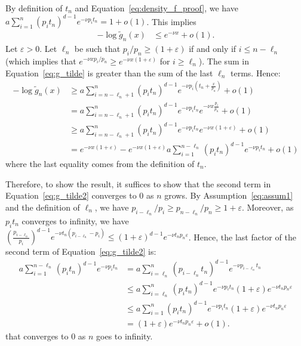 \documentclass{aptpub}
\begin{document}
  By definition of $t_n$ and Equation~\eqref{eq:density_f_proof}, we
  have $a\sum_{i=1}^n (p_it_n)^{d-1} e^{-\nu p_it_n}=1+o(1)$. This
  implies
  \begin{align*}
    -\log \tilde g_n(x) 
      &\le 
        e^{-\nu x}+o(1). 
  \end{align*}
  Let $\varepsilon>0$. Let $\ell_n$ be such that
  $p_{i}/p_n\ge(1+\varepsilon)$ if and only if $i\le n-\ell_n$ (which
  implies that $e^{-\nu x p_i/p_n}\ge e^{-\nu x (1+\varepsilon)}$ for
  $i\ge\ell_n$).  The sum in Equation~\eqref{eq:g_tilde} is greater
  than the sum of the last $\ell_n$ terms. Hence:
  \begin{align}
    - \log \tilde g_n(x) 
    &\ge a\sum_{i=n-\ell_n+1}^{n} (p_it_n)^{d-1} e^{-\nu
      p_i(t_n+\frac{x}{p_n})}+o(1)\nonumber\\ 
    & = a\sum_{i=n-\ell_n+1}^{n} (p_it_n)^{d-1} e^{-\nu
      p_it_n}e^{-\nu x \frac{p_i}{p_n}}  +o(1)\nonumber\\
    &\ge a\sum_{i=n-\ell_n+1}^{n} (p_it_n)^{d-1} e^{-\nu
      p_it_n}e^{-\nu x (1+\varepsilon)}  +o(1)\nonumber\\
    &= e^{-\nu x (1+\varepsilon)} -  e^{-\nu x (1+\varepsilon)}
      a\sum_{i=1}^{n-\ell_n} (p_it_n)^{d-1} e^{-\nu p_it_n} +o(1)
      \label{eq:g_tilde2}
  \end{align}
  where the last equality comes from the definition of $t_n$. 
  
  Therefore, to show the result, it suffices to show that the second
  term in Equation~\eqref{eq:g_tilde2} converges to $0$ as $n$ grows.
  By Assumption~\eqref{eq:assum1} and the definition of $\ell_n$, we
  have $p_{i-\ell_n}/p_i\ge p_{n-\ell_n}/p_n
  \ge1+\varepsilon$.
  Moreover, as $p_it_n$ converges to infinity, we have
  $(\frac{p_{i-\ell_n}}{p_i})^{d-1} e^{-\nu t_n(p_{i-\ell_n}-p_i)}\le
  (1+\varepsilon)^{d-1}e^{-\nu t_np_n\varepsilon}$.
  Hence, the last factor of the second term of
  Equation~\eqref{eq:g_tilde2} is:
    \begin{align*}
    a\sum_{i=1}^{n-\ell_n} (p_it_n)^{d-1} e^{-\nu p_it_n} 
    &= a\sum_{i=\ell_n}^{n} (p_{i-\ell_n}t_n)^{d-1} e^{-\nu p_{i-\ell_n}t_n}\\
    &\le a\sum_{i=\ell_n}^{n} (p_it_n)^{d-1} e^{-\nu p_it_n}
      (1+\varepsilon)e^{-\nu t_np_n\varepsilon}\\
    &\le a\sum_{i=1}^{n} (p_it_n)^{d-1} e^{-\nu p_it_n}
      (1+\varepsilon)e^{-\nu t_np_n\varepsilon}\\
    &= (1+\varepsilon)e^{-\nu t_np_n\varepsilon} + o(1). 
  \end{align*}
  that converges to $0$ as $n$ goes to infinity.  
\end{document}
